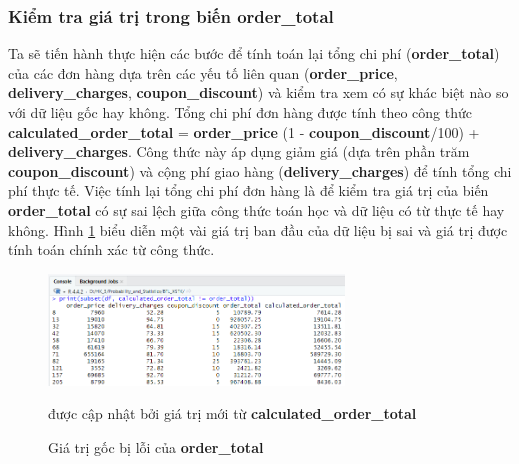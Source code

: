 \subsubsection{Kiểm tra giá trị trong biến order\_total}
Ta sẽ tiến hành thực hiện các bước để tính toán lại tổng chi phí (\textbf{order\_total}) của các đơn hàng dựa trên các yếu tố liên quan (\textbf{order\_price}, \textbf{delivery\_charges}, \textbf{coupon\_discount}) và kiểm tra xem có sự khác biệt nào so với dữ liệu gốc hay không. Tổng chi phí đơn hàng được tính theo công thức \textbf{calculated\_order\_total} = \textbf{order\_price} \times (1 - \textbf{coupon\_discount}/100) + \textbf{delivery\_charges}. Công thức này áp dụng giảm giá (dựa trên phần trăm \textbf{coupon\_discount}) và cộng phí giao hàng (\textbf{delivery\_charges}) để tính tổng chi phí thực tế. Việc tính lại tổng chi phí đơn hàng là để kiểm tra giá trị của biến \textbf{order\_total} có sự sai lệch giữa công thức toán học và dữ liệu có từ thực tế hay không. Hình \ref{f5} biểu diễn một vài giá trị ban đầu của dữ liệu bị sai và giá trị được tính toán chính xác từ công thức.
\begin{figure}[!htbp]
    \centering
    \includegraphics[width=0.7\textwidth]{graphics/Pre_processing_data/f5.PNG}
    \caption{Giá trị gốc bị lỗi của \textbf{order\_total}} được cập nhật bởi giá trị mới từ \textbf{calculated\_order\_total} 
    \label{f5}
\end{figure}

